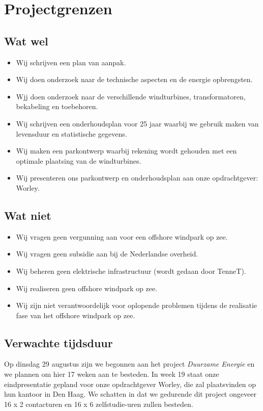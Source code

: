 \section{Projectgrenzen}
\subsection{Wat wel}
\begin{itemize}
    \item Wij schrijven een plan van aanpak.
    \item Wij doen onderzoek naar de technische aspecten en de energie opbrengsten.
    \item Wjj doen onderzoek naar de verschillende windturbines, transformatoren, bekabeling en toebehoren.
    \item Wij schrijven een onderhoudsplan voor 25 jaar waarbij we gebruik maken van levensduur en statistische gegevens.
    \item Wij maken een parkontwerp waarbij rekening wordt gehouden met een optimale plaatsing van de windturbines.
    \item Wij presenteren ons parkontwerp en onderhoudsplan aan onze opdrachtgever: Worley.
\end{itemize}
\subsection{Wat niet}
\begin{itemize}
    \item Wij vragen geen vergunning aan voor een \gls{offshore} windpark op zee.
    \item Wij vragen geen subsidie aan bij de Nederlandse overheid.
    \item Wij beheren geen elektrische infrastructuur (wordt gedaan door TenneT\cite{energieakkoord}).
    \item Wij realiseren geen \gls{offshore} windpark op zee.
    \item Wij zijn niet verantwoordelijk voor oplopende problemen tijdens de realisatie fase van het \gls{offshore} windpark op zee.
\end{itemize}
\subsection{Verwachte tijdsduur}
Op dinsdag 29 augustus zijn we begonnen aan het project \textit{Duurzame Energie} en we plannen om hier 17 weken aan te besteden. In week 19 staat onze eindpresentatie gepland voor onze opdrachtgever Worley, die zal plaatsvinden op hun kantoor in Den Haag. 
We schatten in dat we gedurende dit project ongeveer 16 x 2 contacturen en 16 x 6 zelfstudie-uren zullen besteden\cite{studiewijzer}.

